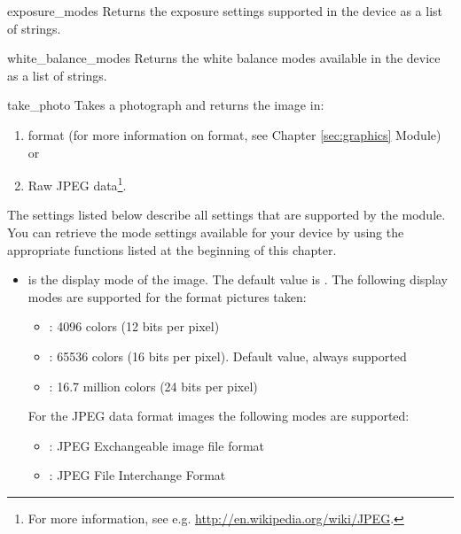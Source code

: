 \begin{funcdesc}{exposure_modes}{}
Returns the exposure settings supported in the device as a list of strings. 
\end{funcdesc}

\begin{funcdesc}{white_balance_modes}{}
Returns the white balance modes available in the device as a list of 
strings. 
\end{funcdesc}

\begin{funcdesc}{take_photo}{}
Takes a photograph and returns the image in:

\begin{enumerate}
  \item {} format (for more information on  format, see 
  Chapter \ref{sec:graphics}  Module) or
  
  \item Raw JPEG data\footnote{For more information, see e.g. 
  \url{http://en.wikipedia.org/wiki/JPEG}.}. 
\end{enumerate}

The settings listed below describe all settings that are supported by the 
 module. You can retrieve the mode settings available for your 
device by using the appropriate functions listed at the beginning of this 
chapter.

\begin{itemize}

\item {} is the display mode of the image. The default value is 
. The following display modes are supported for the  
format pictures taken:
	\begin{itemize}
	\item {}: 4096 colors (12 bits per pixel)
	\item {}: 65536 colors (16 bits per pixel). Default value, always supported
	\item {}: 16.7 million colors (24 bits per pixel)
	\end{itemize}

For the JPEG data format images the following modes are supported:

	\begin{itemize}
	\item {}: JPEG Exchangeable image file format
	\item {}: JPEG File Interchange Format
	\end{itemize}


\end{itemize}
\end{funcdesc}
